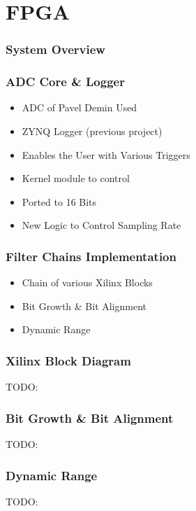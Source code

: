 \section{FPGA}

\begin{frame}
    \frametitle{System Overview}

    \centering
    
    
\end{frame}

\begin{frame}
    \frametitle{ADC Core \& Logger}

    \begin{itemize}
        \item
            ADC of Pavel Demin Used
        \item
            ZYNQ Logger (previous project)
        \item
            Enables the User with Various Triggers
        \item
            Kernel module to control
        \item
            Ported to 16 Bits
        \item
            New Logic to Control Sampling Rate
    \end{itemize}
\end{frame}

\begin{frame}
    \frametitle{Filter Chains Implementation}

    \begin{itemize}
        \item
            Chain of various Xilinx Blocks
        \item
            Bit Growth \& Bit Alignment
        \item
            Dynamic Range
    \end{itemize}
\end{frame}

\begin{frame}
    \frametitle{Xilinx Block Diagram}

    \centering
    TODO:
    
    
\end{frame}

\begin{frame}
    \frametitle{Bit Growth \& Bit Alignment}

    \centering
    TODO:
    
    
\end{frame}

\begin{frame}
    \frametitle{Dynamic Range}

    \centering
    TODO:
    
\end{frame}